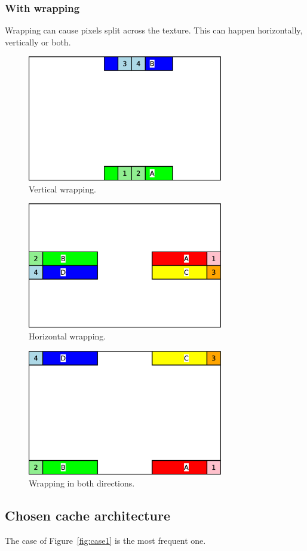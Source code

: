 \documentclass[a4paper,11pt]{article}
\begin{document}
\subsubsection{With wrapping}
Wrapping can cause pixels split across the texture. This can happen horizontally, vertically or both.

\begin{figure}[H]
\centering
\includegraphics[height=55mm]{dist_wrap1.eps}
\caption{Vertical wrapping.}\label{fig:casewrap1}
\end{figure}

\begin{figure}[H]
\centering
\includegraphics[height=55mm]{dist_wrap2.eps}
\caption{Horizontal wrapping.}\label{fig:casewrap2}
\end{figure}

\begin{figure}[H]
\centering
\includegraphics[height=55mm]{dist_wrap3.eps}
\caption{Wrapping in both directions.}\label{fig:casewrap3}
\end{figure}

\subsection{Chosen cache architecture}
The case of Figure~\ref{fig:case1} is the most frequent one.
\end{document}
